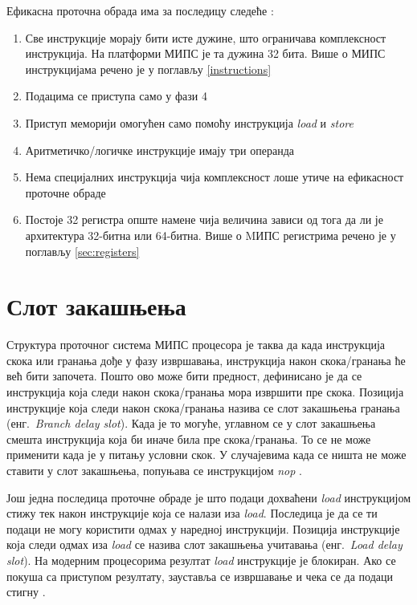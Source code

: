 \documentclass[12pt,oneside]{memoir}
\begin{document}
Ефикасна проточна обрада има за последицу следеће \cite{mips}:
\begin{enumerate}
\item Све инструкције морају бити исте дужине, што ограничава комплексност инструкција. На платформи МИПС је та дужина 32 бита. Више о МИПС инструкцијама речено је у поглављу \ref{instructions}
\item Подацима се приступа само у фази 4
\item Приступ меморији омогућен само помоћу инструкција \textit{load} и \textit{store}
\item Аритметичко/логичке инструкције имају три операнда
\item Нема специјалних инструкција чија комплексност лоше утиче на ефикасност проточне обраде
\item Постоје 32 регистра опште намене чија  величина зависи од тога да ли је архитектура 32-битна или 64-битна. Више о MИПС регистрима речено је у поглављу \ref{sec:registers}
\end{enumerate}

\section{Слот закашњења}
\label{delay-slot}

Структура проточног система МИПС процесора је таква да када инструкција скока или гранања дође у фазу извршавања, инструкција након скока/гранања ће већ бити започета. Пошто ово може бити предност, дефинисано је да се инструкција која следи након скока/гранања мора извршити пре скока. Позиција инструкције која следи након скока/гранања назива се слот закашњења гранања (енг.~\textit{Branch delay slot}). Када је то могуће, углавном се у слот закашњења смешта инструкција која  би иначе била пре скока/гранања. То се не може применити када је у питању условни скок. У случајевима када се ништа не може ставити у слот закашњења, попуњава се инструкцијом \textit{nop} \cite{mips}.

Још једна последица проточне обраде је што подаци дохваћени \textit{load} инструкцијом стижу тек након инструкције која се налази иза \textit{load}. Последица је да се ти подаци не могу користити одмах у наредној инструкцији. Позиција инструкције која следи одмах иза \textit{load} се назива слот закашњења учитавања (енг.~\textit{Load delay slot}). На модерним процесорима резултат \textit{load} инструкције је блокиран. Ако се покуша са приступом резултату, зауставља се извршавање и чека се да подаци стигну \cite{mips}. 
\end{document}
